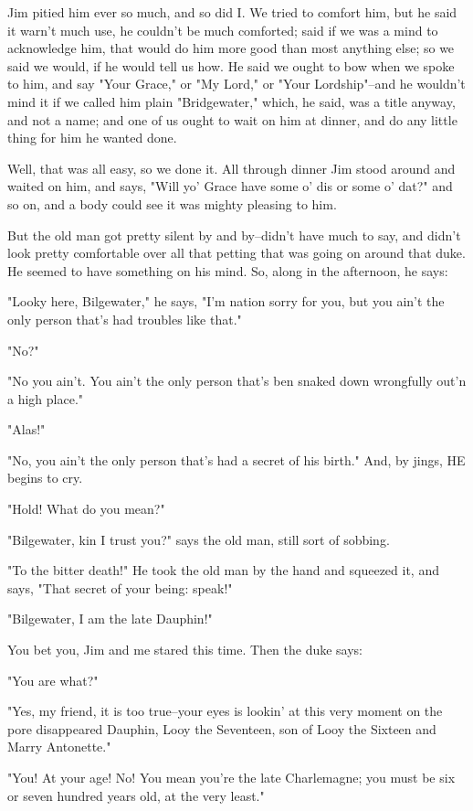 Jim pitied him ever so much, and so did I. We tried to comfort him, but
he said it warn't much use, he couldn't be much comforted; said if we was
a mind to acknowledge him, that would do him more good than most anything
else; so we said we would, if he would tell us how.  He said we ought to
bow when we spoke to him, and say "Your Grace," or "My Lord," or "Your
Lordship"--and he wouldn't mind it if we called him plain
"Bridgewater," which, he said, was a title anyway, and not a name; and
one of us ought to wait on him at dinner, and do any little thing for him
he wanted done.

Well, that was all easy, so we done it.  All through dinner Jim stood
around and waited on him, and says, "Will yo' Grace have some o' dis or
some o' dat?" and so on, and a body could see it was mighty pleasing to
him.

But the old man got pretty silent by and by--didn't have much to say, and
didn't look pretty comfortable over all that petting that was going on
around that duke.  He seemed to have something on his mind.  So, along in
the afternoon, he says:

"Looky here, Bilgewater," he says, "I'm nation sorry for you, but you
ain't the only person that's had troubles like that."

"No?"

"No you ain't.  You ain't the only person that's ben snaked down
wrongfully out'n a high place."

"Alas!"

"No, you ain't the only person that's had a secret of his birth."  And,
by jings, HE begins to cry.

"Hold!  What do you mean?"

"Bilgewater, kin I trust you?" says the old man, still sort of sobbing.

"To the bitter death!"  He took the old man by the hand and squeezed it,
and says, "That secret of your being:  speak!"

"Bilgewater, I am the late Dauphin!"

You bet you, Jim and me stared this time.  Then the duke says:

"You are what?"

"Yes, my friend, it is too true--your eyes is lookin' at this very moment
on the pore disappeared Dauphin, Looy the Seventeen, son of Looy the
Sixteen and Marry Antonette."

"You!  At your age!  No!  You mean you're the late Charlemagne; you must
be six or seven hundred years old, at the very least."

